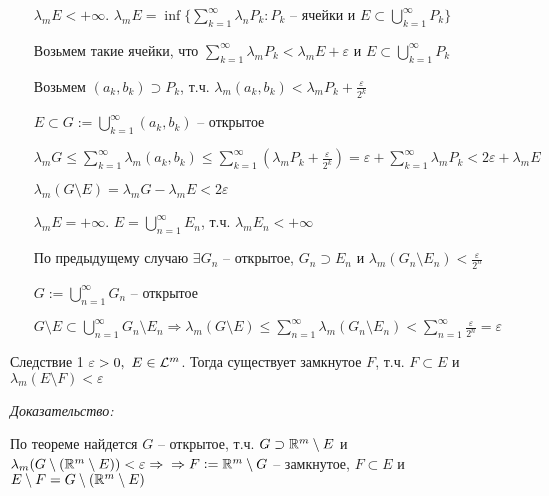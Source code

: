 \documentclass[12pt]{article}
\begin{document}
\begin{itemize}
    \item[$\lambda_m E < + \infty$. ] $\lambda_m E = \inf \{\sum\limits_{k = 1}^\infty \lambda_n P_k : P_k \text{ -- ячейки и } E \subset \bigcup\limits_{k = 1}^\infty P_k\}$
    
    Возьмем такие ячейки, что $\sum\limits_{k = 1}^\infty \lambda_m P_k < \lambda_m E + \varepsilon$ и $E \subset \bigcup\limits_{k = 1}^\infty P_k$

    Возьмем $(a_k, b_k) \supset P_k$, т.ч. $\lambda_m (a_k, b_k) < \lambda_m P_k + \frac{\varepsilon}{2^k}$

    $E \subset G := \bigcup\limits_{k = 1}^\infty (a_k, b_k)$ -- открытое

    $\lambda_m G \leq \sum\limits_{k = 1}^\infty \lambda_m (a_k, b_k) \leq \sum\limits_{k = 1}^\infty (\lambda_m P_k + \frac{\varepsilon}{2^k}) = \varepsilon + \sum\limits_{k = 1}^\infty \lambda_m P_k < 2\varepsilon + \lambda_m E$

    $\lambda_m (G \setminus E) = \lambda_m G - \lambda_m E < 2 \varepsilon$

    \item[$\lambda_m E = + \infty$. ] $E = \bigcup\limits_{n = 1}^\infty E_n$, т.ч. $\lambda_m E_n < + \infty$
    
    По предыдущему случаю $\exists G_n$ -- открытое, $G_n \supset E_n$ и $\lambda_m (G_n \setminus E_n) < \frac{\varepsilon}{2^n}$

    $G := \bigcup\limits_{n = 1}^\infty G_n$ -- открытое 

    $G \setminus E \subset \bigcup\limits_{n = 1}^\infty G_n \setminus E_n \Rightarrow \lambda_m (G \setminus E) \leq \sum\limits_{n = 1}^\infty \lambda_m (G_n \setminus E_n) < \sum\limits_{n = 1}^\infty \frac{\varepsilon}{2^n} = \varepsilon$
\end{itemize}

\begin{theo}{Следствие 1}
    $\varepsilon > 0,\ E \in \mathcal{L}^m$. Тогда существует замкнутое $F$, т.ч. $F \subset E$ и $\lambda_m (E \setminus F) < \varepsilon$
\end{theo}

\textit{Доказательство:}

По теореме найдется $G$ -- открытое, т.ч. $G \supset \mathbb R^m \setminus E$ и $\lambda_m (G \setminus (\mathbb R^m \setminus E)) < \varepsilon \Rightarrow \\
\Rightarrow F := \mathbb R^m \setminus G$ -- замкнутое, $F \subset E$ и $E \setminus F = G \setminus (\mathbb R^m \setminus E)$
\end{document}
